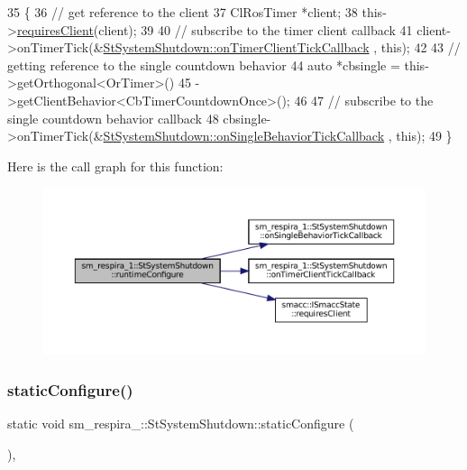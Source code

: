 \begin{DoxyCode}
35     \{
36         \textcolor{comment}{// get reference to the client}
37         ClRosTimer *client;
38         this->\hyperlink{classsmacc_1_1ISmaccState_a7f95c9f0a6ea2d6f18d1aec0519de4ac}{requiresClient}(client);
39 
40         \textcolor{comment}{// subscribe to the timer client callback}
41         client->onTimerTick(&\hyperlink{structsm__respira__1_1_1StSystemShutdown_a4c113d1875fb5a538c45973b87900ff6}{StSystemShutdown::onTimerClientTickCallback}
      , \textcolor{keyword}{this});
42 
43         \textcolor{comment}{// getting reference to the single countdown behavior}
44         \textcolor{keyword}{auto} *cbsingle = this->getOrthogonal<OrTimer>()
45                              ->getClientBehavior<CbTimerCountdownOnce>();
46 
47         \textcolor{comment}{// subscribe to the single countdown behavior callback}
48         cbsingle->onTimerTick(&\hyperlink{structsm__respira__1_1_1StSystemShutdown_af0466e4c8c2527eeb76888d8dfec396c}{StSystemShutdown::onSingleBehaviorTickCallback}
      , \textcolor{keyword}{this});
49     \}
\end{DoxyCode}
Here is the call graph for this function\+:
\nopagebreak
\begin{figure}[H]
\begin{center}
\leavevmode
\includegraphics[width=350pt]{structsm__respira__1_1_1StSystemShutdown_a0e64b317e2720facbfeabc99956bf071_cgraph}
\end{center}
\end{figure}
\mbox{\label{structsm__respira__1_1_1StSystemShutdown_a3e55c52ddc658248bf37a7c7dc353a44}} 
\subsubsection{\texorpdfstring{static\+Configure()}{staticConfigure()}}
{\footnotesize\ttfamily static void sm\+\_\+respira\+\_\+::\+St\+System\+Shutdown\+::static\+Configure (\begin{DoxyParamCaption}{ }\end{DoxyParamCaption})\hspace{0.3cm}{\ttfamily [inline]}, {\ttfamily [static]}}



